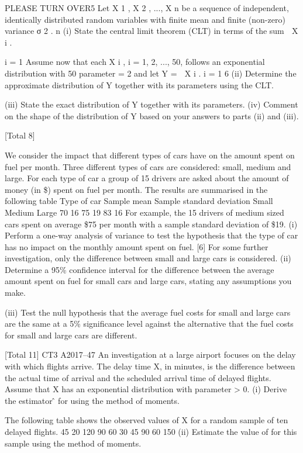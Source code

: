 \documentclass[a4paper,12pt]{article}
\begin{document}
\begin{enumerate}
PLEASE TURN OVER5
Let X 1 , X 2 , ..., X n be a sequence of independent, identically distributed random
variables with finite mean \mu and finite (non-zero) variance σ 2 .
n
(i)
State the central limit theorem (CLT) in terms of the sum
 X i .

i = 1
Assume now that each X i , i = 1, 2, ..., 50, follows an exponential distribution with
50
parameter \lambda = 2 and let Y =  X i .
i = 1
6
(ii) Determine the approximate distribution of Y together with its parameters using
the CLT.

(iii) State the exact distribution of Y together with its parameters.
(iv) Comment on the shape of the distribution of Y based on your answers to parts
(ii) and (iii).

[Total 8]

We consider the impact that different types of cars have on the amount spent on fuel
per month. Three different types of cars are considered: small, medium and large.
For each type of car a group of 15 drivers are asked about the amount of money (in \$)
spent on fuel per month. The results are summarised in the following table
Type of car
Sample mean
Sample standard deviation
Small Medium Large
70
16
75
19
83
16
For example, the 15 drivers of medium sized cars spent on average \$75 per month
with a sample standard deviation of \$19.
(i)
Perform a one-way analysis of variance to test the hypothesis that the type of
car has no impact on the monthly amount spent on fuel.
[6]
For some further investigation, only the difference between small and large cars is
considered.
(ii) Determine a 95\% confidence interval for the difference between the average
amount spent on fuel for small cars and large cars, stating any assumptions
you make.

(iii) Test the null hypothesis that the average fuel costs for small and large cars are
the same at a 5\% significance level against the alternative that the fuel costs
for small and large cars are different.

[Total 11]
CT3 A2017–47
An investigation at a large airport focuses on the delay with which flights arrive. The
delay time X, in minutes, is the difference between the actual time of arrival and the
scheduled arrival time of delayed flights. Assume that X has an exponential
distribution with parameter \lambda > 0.
(i)
Derive the estimator \lambdâ for \lambda using the method of moments.

The following table shows the observed values of X for a random sample of ten
delayed flights.
45 20 120 90 60 30 45 90 60 150
(ii)
Estimate the value of \lambda for this sample using the method of moments.


\end{enumerate}
\end{document}
